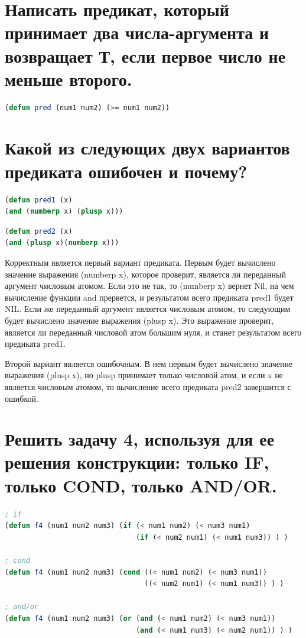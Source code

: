 \documentclass[12pt]{report}
\begin{document}
\section{Написать предикат, который принимает два числа-аргумента и возвращает
Т, если первое число не меньше второго.}

\begin{lstlisting}[language=Lisp]
(defun pred (num1 num2) (>= num1 num2))
\end{lstlisting}


\section{Какой из следующих двух вариантов предиката ошибочен и почему?}

\begin{lstlisting}[language=Lisp]
(defun pred1 (x) 
(and (numberp x) (plusp x)))
\end{lstlisting}

\begin{lstlisting}[language=Lisp]
(defun pred2 (x)
(and (plusp x)(numberp x)))
\end{lstlisting}

Корректным является первый вариант предиката. Первым будет вычислено значение выражения (numberp x), которое проверит, является ли переданный аргумент числовым атомом. Если это не так, то (numberp x) вернет Nil, на чем вычисление функции and прервется, и результатом всего предиката pred1 будет NIL. Если же переданный аргумент является числовым атомом, то следующим будет вычислено значение выражения (plusp x). Это выражение проверит, является ли переданный числовой атом большим нуля, и станет результатом всего предиката pred1.

Второй вариант является ошибочным. В нем первым будет вычислено значение выражения (plusp x), но plusp принимает только числовой атом, и если x не является числовым атомом, то вычисление всего предиката pred2 завершится с ошибкой.


\section{Решить задачу 4, используя для ее решения конструкции:
только IF, только COND, только AND/OR.}

\begin{lstlisting}[language=Lisp]
; if
(defun f4 (num1 num2 num3) (if (< num1 num2) (< num3 num1) 
                               (if (< num2 num1) (< num1 num3)) ) )

; cond
(defun f4 (num1 num2 num3) (cond ((< num1 num2) (< num3 num1)) 
                                 ((< num2 num1) (< num1 num3)) ) )

; and/or
(defun f4 (num1 num2 num3) (or (and (< num1 num2) (< num3 num1)) 
                               (and (< num1 num3) (< num2 num1)) ) )
\end{lstlisting}
\end{document}
